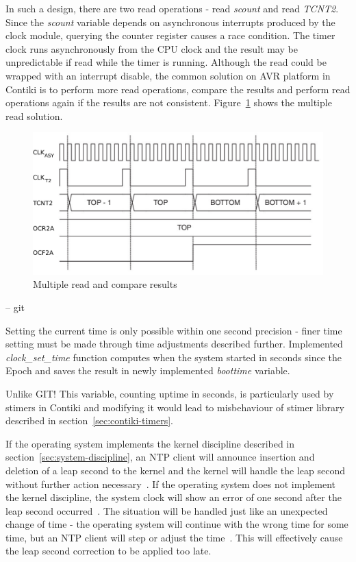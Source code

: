 In such a design, there are two read operations - read {\it{scount}} and read {\it{TCNT2}}.
Since the {\it{scount}} variable depends on asynchronous interrupts produced by
the clock module, querying the counter register causes a race condition.
The timer clock runs asynchronously from the CPU clock and
the result may be unpredictable if read while the timer is running.
Although the read could be wrapped with an interrupt disable,
the common solution on AVR platform in Contiki is to perform more read operations,
compare the results and perform read operations again if the results are not consistent.
Figure~\ref{fig:design-read} shows the multiple read solution.

\begin{figure}
  \centering
  \includegraphics[width=12cm,keepaspectratio]{fig/timing-diagram.pdf}
  \caption{Multiple read and compare results}
  \label{fig:design-read}
\end{figure}

-- git

Setting the current time is only possible within one second precision -
finer time setting must be made through time adjustments described further.
Implemented {\it{clock\_set\_time}} function computes when the system started
in seconds since the Epoch and saves the result in newly implemented {\it{boottime}} variable.



Unlike GIT!
This variable, counting uptime in seconds,
is particularly used by stimers in Contiki
and modifying it would lead to misbehaviour of stimer library
described in section~\ref{sec:contiki-timers}.


If the operating system implements the kernel discipline described in section~\ref{sec:system-discipline},
an NTP client will announce insertion and deletion of a leap second to the kernel and
the kernel will handle the leap second without further action necessary~\cite{ntp-faq}.
If the operating system does not implement the kernel discipline,
the system clock will show an error of one second after the leap second occurred~\cite{ntp-faq}.
The situation will be handled just like an unexpected change of time -
the operating system will continue with the wrong time for some time,
but an NTP client will step or adjust the time~\cite{ntp-faq}.
This will effectively cause the leap second correction to be applied too late.

